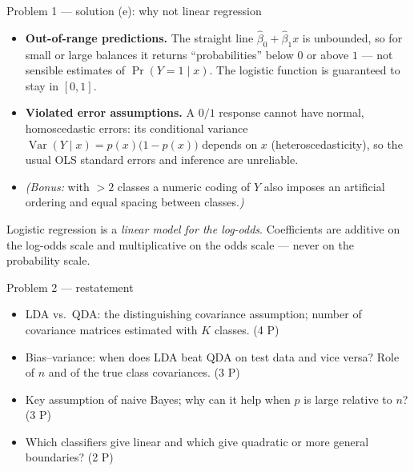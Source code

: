 \documentclass[aspectratio=169,11pt]{beamer}
\begin{document}
\begin{frame}{Problem 1 --- solution (e): why not linear regression}
  \begin{solutionbox}
    \begin{itemize}
      \item[(1)] \textbf{Out-of-range predictions.} The straight line
        $\hat{\beta}_0+\hat{\beta}_1x$ is unbounded, so for small or large balances it
        returns ``probabilities'' below $0$ or above $1$ --- not sensible estimates of
        $\Pr(Y=1\mid x)$. The logistic function is guaranteed to stay in $[0,1]$.
      \item[(2)] \textbf{Violated error assumptions.} A $0/1$ response cannot have normal,
        homoscedastic errors: its conditional variance
        $\operatorname{Var}(Y\mid x)=p(x)\bigl(1-p(x)\bigr)$ depends on $x$
        (heteroscedasticity), so the usual OLS standard errors and inference are unreliable.
      \item[] \emph{(Bonus:} with $>2$ classes a numeric coding of $Y$ also imposes an
        artificial ordering and equal spacing between classes.\emph{)}
    \end{itemize}
  \end{solutionbox}
  \begin{takeaway}[Remember]
    Logistic regression is a \emph{linear model for the log-odds}. Coefficients are additive
    on the log-odds scale and multiplicative on the odds scale --- never on the probability
    scale.
  \end{takeaway}
\end{frame}

\begin{frame}{Problem 2 --- restatement}
  \begin{exercise}
    \begin{itemize}
      \item[(a)] LDA vs.\ QDA: the distinguishing covariance assumption; number of
        covariance matrices estimated with $K$ classes. \hfill (4 P)
      \item[(b)] Bias--variance: when does LDA beat QDA on test data and vice versa?
        Role of $n$ and of the true class covariances. \hfill (3 P)
      \item[(c)] Key assumption of naive Bayes; why can it help when $p$ is large relative
        to $n$? \hfill (3 P)
      \item[(d)] Which classifiers give linear and which give quadratic or more general
        boundaries? \hfill (2 P)
    \end{itemize}
  \end{exercise}
\end{frame}
\end{document}

